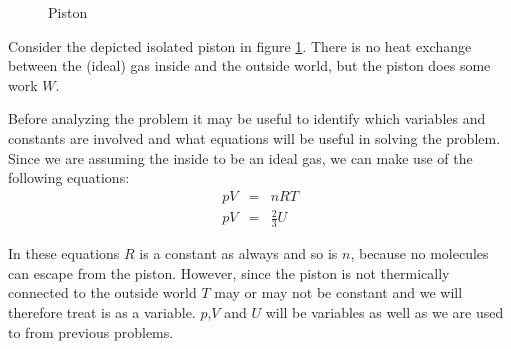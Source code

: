 \documentclass[12pt,letterpaper]{article}
\begin{document}
\begin{figure}
\label{piston}
\begin{center}
\end{center}
\caption{Piston}
\end{figure}

Consider the depicted isolated piston in figure \ref{piston}. There is no heat exchange between the (ideal) gas inside and the outside world, but the piston does some work $W$. 

Before analyzing the problem it may be useful to identify which variables and constants are involved and what equations will be useful in solving the problem. Since we are assuming the inside to be an ideal gas, we can make use of the following equations:
\begin{eqnarray*}
	pV &=& nRT\\
	pV &=& \frac{2}{3}U
\end{eqnarray*}

In these equations $R$ is a constant as always and so is $n$, because no molecules can escape from the piston. However, since the piston is not thermically  connected to the outside world $T$ may or may not be constant and we will therefore treat is as a variable. $p$,$V$ and $U$ will be variables as well as we are used to from previous problems.
\end{document}
